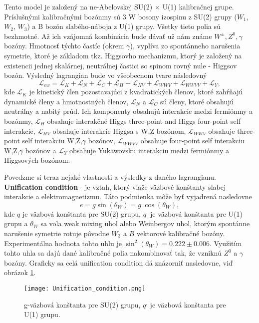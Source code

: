 \documentclass[../../main.tex]{subfiles}
\begin{document}
Tento model je založený na ne-Abelovskej SU(2) $\times$ U(1) kalibračnej grupe. Príslušnými kalibračnými bozónmy sú 3 W bosony izospinu z SU(2) grupy ($W_1$, $W_2$, $W_3$) a B bozón slabého-náboja z U(1) grupy. Všetky tieto polia sú bezhmotné. Až ich vzájomná kombinácia bude dávať už nám známe $W^{\pm}, Z^0, \gamma$ bozóny. Hmotnosť týchto častíc (okrem $\gamma$), vyplíva zo spontánneho narušenia symetrie, ktoré je základom tkz. Higgsovho mechanizmu, ktorý je založený na existencii jednej skalárnej, neutrálnej častici so spinom rovný nule - Higgsov bozón. Výsledný lagrangian bude vo všeobecnom tvare následovný
\begin{equation}
\mathcal{L}_{ew}=\mathcal{L}_{K}+\mathcal{L}_{N}+\mathcal{L}_{C}+\mathcal{L}_{H}+\mathcal{L}_{HV}+\mathcal{L}_{WWV}+\mathcal{L}_{WWVV}+\mathcal{L}_{Y},
\end{equation}
kde $\mathcal{L}_{K}$ je kinetický člen pozostavajúci z kvadratických členov, ktoré zahŕňajú dynamické členy a hmotnostných členov, $\mathcal{L}_{N}$ a $\mathcal{L}_{C}$ sú členy, ktoré obsahujú neutrálny a nabitý prúd. Ich komponenty obsahujú interakcie medzi fermiónmy a bozónmy, $\mathcal{L}_{H}$ obsahuje interakčné Higgs three-point and Higgs four-point self interakcie, $\mathcal{L}_{HV}$ obsahuje interakcie Higgsa s W,Z bozónom, $\mathcal{L}_{WWV}$
obsahuje three-point self interakciu W,Z,$\gamma$ bozónov, $\mathcal{L}_{WWVV}$ obsahuje four-point self interakciu W,Z,$\gamma$ bozónov a $\mathcal{L}_{Y}$ obsahuje Yukawovsku interakciu medzi fermiónmy a Higgsových bozónom.

Povedzme si teraz nejaké vlastnosti a výsledky z daného lagrangianu. \textbf{Unification condition} - je vzťah, ktorý viaže väzbové konštanty slabej interakcie a elektromagnetizmu. Táto podmienka môže byť vyjadrená nasledovne 
$$
e=g\sin(\theta_W)=g^,\cos(\theta_W),
$$
kde $q$ je väzbová konštanta pre SU(2) grupu, $q^,$ je väzbová konštanta pre U(1) grupu a $\theta_W$ sa vola weak mixing uhol alebo Weinbergov uhol, ktorým spontánne narušenie symetrie rotuje pôvodne $W_3$ a $B$ vektorové kalibračné bozóny. Experimentálna hodnota tohto uhlu je $\sin^2(\theta_W)=0.222\pm0.006$. Využitím tohto uhla sa dajú dané kalibračné polia nakombinovať tak, že vzniknú $Z^0$ a $\gamma$ bozóny. Graficky sa celá unification condition dá znázorniť nasledovne, viď obrázok \ref{sf1:fig:unifi}.
\begin{figure}[!h]
\centering
\texttt{[image: Unification\_condition.png]}
\caption{g-väzbová konštanta pre SU(2) grupu, $q^{,}$ je väzbová konštanta pre U(1) grupu.}
\label{sf1:fig:unifi}
\end{figure}
\end{document}
